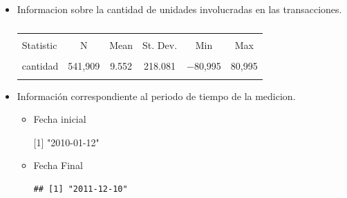 

\begin{itemize}
 \item Informacion sobre la cantidad de unidades involucradas en las transacciones.
\begin{kframe}
\begin{alltt}
  \hlkwb{=} \hlstd{(} \hlopt{$}
\end{alltt}
\end{kframe}
\begin{table}[!htbp] \centering 
  \caption{} 
  \label{} 
\begin{tabular}{@{\extracolsep{5pt}}lccccc} 
\\[-1.8ex]\hline 
\hline \\[-1.8ex] 
Statistic & \multicolumn{1}{c}{N} & \multicolumn{1}{c}{Mean} & \multicolumn{1}{c}{St. Dev.} & \multicolumn{1}{c}{Min} & \multicolumn{1}{c}{Max} \\ 
\hline \\[-1.8ex] 
cantidad & 541,909 & 9.552 & 218.081 & $-$80,995 & 80,995 \\ 
\hline \\[-1.8ex] 
\end{tabular} 
\end{table} 

 \item Información correspondiente al periodo de tiempo de la medicion.
 
 \begin{itemize}
  \item Fecha inicial 
\begin{kframe}
\begin{alltt}
 \hlstd{(range[}\hlstd{])}
\end{alltt}
\end{kframe}[1] "2010-01-12"

  \item Fecha Final 
\begin{knitrout}
\color{fgcolor}\begin{kframe}
\begin{alltt}
 \hlstd{(range[}\hlstd{])}
\end{alltt}
\begin{verbatim}
## [1] "2011-12-10"
\end{verbatim}
\end{kframe}
\end{knitrout}
 \end{itemize} 
  

\end{itemize}
